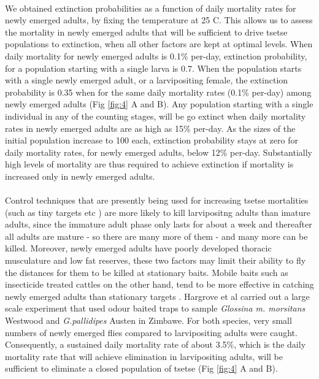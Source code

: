 \documentclass[smallextended]{svjour3}
\begin{document}
\paragraph{}
We obtained extinction probabilities as a function of daily mortality rates for newly emerged adults, by
fixing the temperature at 25 \degree C. This allows us to assess the mortality in newly emerged adults that will be sufficient to drive tsetse populations to extinction, when all other factors are kept at optimal levels. When daily mortality for newly emerged adults is 0.1\% per-day, extinction probability, for a population starting with a single larva is 0.7. When the population starts with a single newly emerged adult, or a larvipositing female, the extinction probability is 0.35 when for the same daily mortality rates (0.1\% per-day) among  newly emerged adults (Fig \ref{fig:4} A and B). Any population starting with a single individual in any of the counting stages, will be go extinct when daily mortality rates in newly emerged adults are as high as 15\% per-day. As the sizes of the initial population increase to 100 each, extinction probability stays at zero for daily mortality rates, for newly emerged adults, below 12\% per-day. Substantially high levels of mortality are thus required to achieve extinction if mortality is increased only in newly emerged adults.
\paragraph{}
Control techniques that are presently being used for increasing tsetse mortalities (such as tiny targets etc \cite{Hargrove2000,Esterhuizen2006,Shaw2015,Mbewe2018a}) are more likely to kill larvipositng adults than imature adults, since the immature adult phase only lasts for  about a week and thereafter all adults are mature - so there are many more of them - and many more can be killed. Moreover, newly emerged adults have poorly developed thoracic musculature and low fat reserves, these two factors may limit their ability to fly the distances for them to be killed at stationary baits. Mobile baits such as insecticide treated cattles on the other hand, tend to be more effective in catching newly emerged adults than stationary targets \cite{Hargrove1991}. Hargrove et al \cite{HargroveJ.W.HollowayM.T.P.ValeG.A.GoughA.J.E.Hall1995} carried out a large scale experiment that used  odour baited traps to sample  {\it Glossina m. morsitans} Westwood and {\it G.pallidipes} Austen in Zimbawe. For both species, very small numbers of newly emerged flies compared to larvipositing adults were caught. Consequently, a sustained daily mortality rate of about 3.5\%, which is the daily mortality rate that will achieve elimination in larvipositing adults, will be sufficient to eliminate a closed population of tsetse (Fig \ref{fig:4} A and B).  
\end{document}
